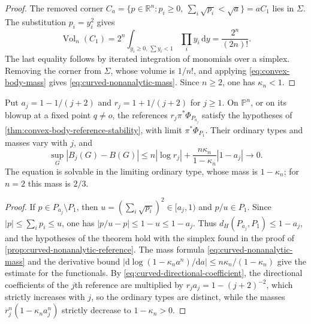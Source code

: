\begin{proof}
The removed corner $C_a=\{p\in\mathbb R^n:p_i\geq0,\ \sum_i\sqrt{p_i}<\sqrt a\}=aC_1$ lies in $\Sigma$. The substitution $p_i=y_i^2$ gives
\[
 \operatorname{Vol}_n(C_1)
 =2^n\int_{y_i\geq0,\,\sum y_i<1}\prod_i y_i\,\mathrm{d}y
 =\frac{2^n}{(2n)!}.
\]
The last equality follows by iterated integration of monomials over a simplex. Removing the corner from $\Sigma$, whose volume is $1/n!$, and applying \eqref{eq:convex-body-mass} gives \eqref{eq:curved-nonanalytic-mass}. Since $n\geq2$, one has $\kappa_n<1$.
\end{proof}

\begin{corollary}\label{cor:curved-reference-stability}
Put $a_j=1-1/(j+2)$ and $r_j=1+1/(j+2)$ for $j\geq1$. On $\mathbb P^n$, or on its blowup at a fixed point $q\ne o$, the references $r_j\pi^*\Phi_{P_{a_j}}$ satisfy the hypotheses of \cref{thm:convex-body-reference-stability}, with limit $\pi^*\Phi_{P_1}$. Their ordinary types and masses vary with $j$, and
\[
 \sup_G|B_j(G)-B(G)|
 \leq n|\log r_j|+\frac{n\kappa_n}{1-\kappa_n}|1-a_j|\longrightarrow0.
\]
The equation is solvable in the limiting ordinary type, whose mass is $1-\kappa_n$; for $n=2$ this mass is $2/3$.
\end{corollary}
\begin{proof}
If $p\in P_{a_j}\setminus P_1$, then $u=(\sum_i\sqrt{p_i})^2\in[a_j,1)$ and $p/u\in P_1$. Since $|p|\leq\sum_ip_i\leq u$, one has $|p/u-p|\leq1-u\leq1-a_j$. Thus $d_H(P_{a_j},P_1)\leq1-a_j$, and the hypotheses of the theorem hold with the simplex found in the proof of \cref{prop:curved-nonanalytic-reference}. The mass formula \eqref{eq:curved-nonanalytic-mass} and the derivative bound $|\mathrm{d}\log(1-\kappa_n a^n)/\mathrm{d}a|\leq n\kappa_n/(1-\kappa_n)$ give the estimate for the functionals. By \eqref{eq:curved-directional-coefficient}, the directional coefficients of the $j$th reference are multiplied by $r_ja_j=1-(j+2)^{-2}$, which strictly increases with $j$, so the ordinary types are distinct, while the masses $r_j^n(1-\kappa_n a_j^n)$ strictly decrease to $1-\kappa_n>0$.
\end{proof}
